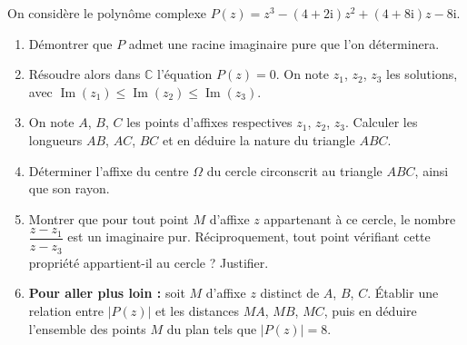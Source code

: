 \documentclass[11pt]{article}
\begin{document}
\begin{exercice}
On considère le polynôme complexe $P(z)=z^3-(4+2\mathrm{i})z^2+(4+8\mathrm{i})z-8\mathrm{i}$.
\begin{enumerate}
  \item Démontrer que $P$ admet une racine imaginaire pure que l'on déterminera.
  \item Résoudre alors dans $\mathbb{C}$ l'équation $P(z)=0$. On note $z_1$, $z_2$, $z_3$ les solutions, avec $\operatorname{Im}(z_1)\leq\operatorname{Im}(z_2)\leq\operatorname{Im}(z_3)$.
  \item On note $A$, $B$, $C$ les points d'affixes respectives $z_1$, $z_2$, $z_3$. Calculer les longueurs $AB$, $AC$, $BC$ et en déduire la nature du triangle $ABC$.
  \item Déterminer l'affixe du centre $\Omega$ du cercle circonscrit au triangle $ABC$, ainsi que son rayon.
  \item Montrer que pour tout point $M$ d'affixe $z$ appartenant à ce cercle, le nombre $\dfrac{z-z_1}{z-z_3}$ est un imaginaire pur. Réciproquement, tout point vérifiant cette propriété appartient-il au cercle ? Justifier.
  \item \textbf{Pour aller plus loin :} soit $M$ d'affixe $z$ distinct de $A$, $B$, $C$. Établir une relation entre $|P(z)|$ et les distances $MA$, $MB$, $MC$, puis en déduire l'ensemble des points $M$ du plan tels que $|P(z)|=8$.
\end{enumerate}
\end{exercice}
\end{document}
